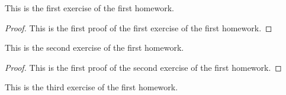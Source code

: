 \begin{exercise}\label{ex:H.1.1}
    This is the first exercise of the first homework.
\end{exercise}
\begin{proof}
    This is the first proof of the first exercise of the first homework.
\end{proof}

\begin{exercise}\label{ex:H.1.2}
    This is the second exercise of the first homework.
\end{exercise}

\begin{proof}
    This is the first proof of the second exercise of the first homework.
\end{proof}

\begin{exercise}\label{ex:H.1.3}
    This is the third exercise of the first homework.
\end{exercise}
